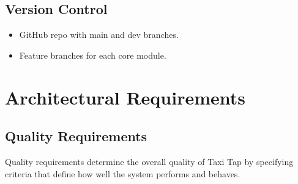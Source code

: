 \documentclass[a4paper,12pt]{article}
\begin{document}
\subsection{Version Control}
\begin{itemize}
    \item GitHub repo with main and dev branches.
    \item Feature branches for each core module.
\end{itemize}

\section{Architectural Requirements}

\subsection{Quality Requirements}
Quality requirements determine the overall quality of Taxi Tap by specifying criteria that define how well the system performs and behaves.
\end{document}
